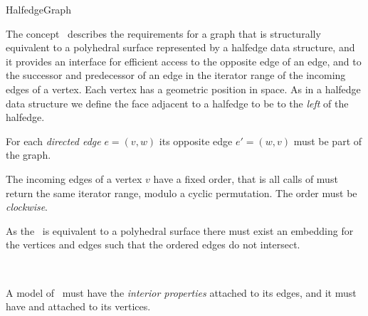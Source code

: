 
\begin{ccRefConcept}{HalfedgeGraph}


\ccDefinition

The concept \ccRefName\ describes the requirements for a graph that is
structurally equivalent to a polyhedral surface represented by a
halfedge data structure, and it provides an interface for efficient
access to the opposite edge of an edge, and to the successor and
predecessor of an edge in the iterator range of the incoming edges of
a vertex.  Each vertex has a geometric position in space. As in a
halfedge data structure we define the face adjacent to a halfedge to be
to the {\em left} of the halfedge.



For each {\em directed edge} $e=(v,w)$ its opposite edge $e'=(w,v)$
must be part of the graph.

The incoming edges of a vertex $v$ have a fixed order, that is all
calls of  must return the same iterator range,
modulo a cyclic permutation. The order must be {\em clockwise}.

As the \ccRefName\ is equivalent to a polyhedral surface there must exist an embedding
for the vertices and edges such that the ordered edges do not intersect.


\ccRefines
{}\\

A model of \ccRefName\ must have the {\em interior properties} 
 attached to its edges,
and it must have  and  attached to its vertices.





\end{ccRefConcept}
